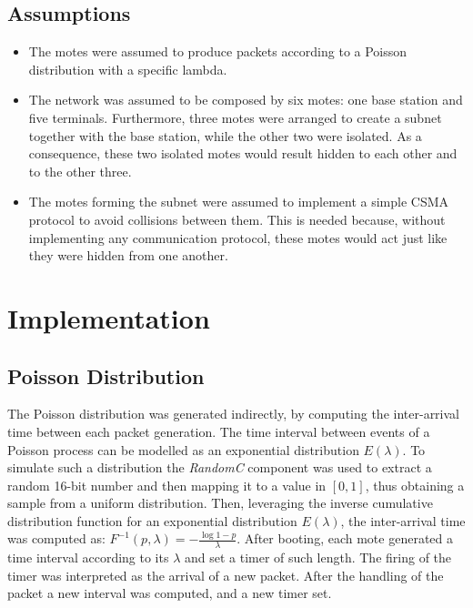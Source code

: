 \documentclass{article}
\begin{document}
\subsection{Assumptions}
\begin{itemize}
  \item The motes were assumed to produce packets according to a Poisson distribution with a specific lambda. 
  \item The network was assumed to be composed by six motes: one base station and five terminals. Furthermore, three motes were arranged to create a subnet together with the base station, while the other two were isolated. As a consequence, these two isolated motes would result hidden to each other and to the other three.
  
  \begin{center}
  \end{center}
  
  \item The motes forming the subnet were assumed to implement a simple CSMA protocol to avoid collisions between them. This is needed because, without implementing any communication protocol, these motes would act just like they were hidden from one another.
\end{itemize}

\newpage

\section{Implementation}
\subsection{Poisson Distribution}
The Poisson distribution was generated indirectly, by computing the inter-arrival time between each packet generation. The time interval between events of a Poisson process can be modelled as an exponential distribution $E(\lambda)$. To simulate such a distribution the \textit{RandomC} component was used to extract a random 16-bit number and then mapping it to a value in $[0, 1]$, thus obtaining a sample from a uniform distribution. Then, leveraging the inverse cumulative distribution function for an exponential distribution $E(\lambda)$, the inter-arrival time was computed as: $F^{-1}(p, \lambda) = -\frac{\log{1- p}}{\lambda}$. After booting, each mote generated a time interval according to its $\lambda$ and set a timer of such length. The firing of the timer was interpreted as the arrival of a new packet. After the handling of the packet a new interval was computed, and a new timer set.
\end{document}
